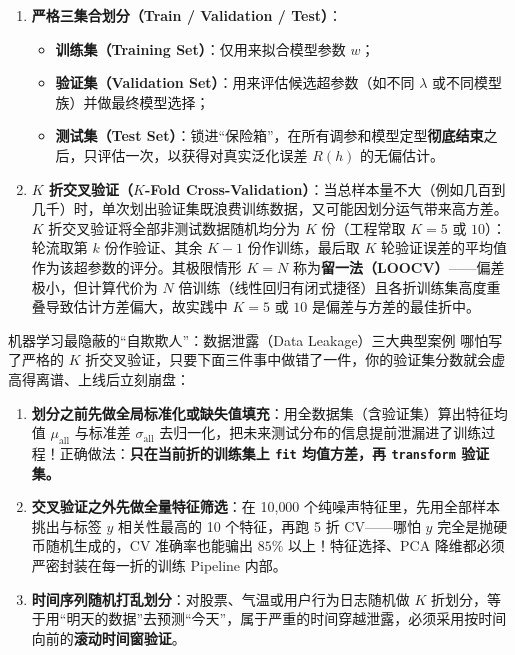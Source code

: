 \begin{enumerate}
  \item \textbf{严格三集合划分（Train / Validation / Test）}：
  \begin{itemize}
    \item \textbf{训练集（Training Set）}：仅用来拟合模型参数 $w$；
    \item \textbf{验证集（Validation Set）}：用来评估候选超参数（如不同 $\lambda$ 或不同模型族）并做最终模型选择；
    \item \textbf{测试集（Test Set）}：锁进“保险箱”，在所有调参和模型定型\textbf{彻底结束}之后，只评估一次，以获得对真实泛化误差 $R(h)$ 的无偏估计。
  \end{itemize}
  \item \textbf{$K$ 折交叉验证（$K$-Fold Cross-Validation）}：当总样本量不大（例如几百到几千）时，单次划出验证集既浪费训练数据，又可能因划分运气带来高方差。$K$ 折交叉验证将全部非测试数据随机均分为 $K$ 份（工程常取 $K = 5$ 或 $10$）：轮流取第 $k$ 份作验证、其余 $K-1$ 份作训练，最后取 $K$ 轮验证误差的平均值作为该超参数的评分。其极限情形 $K = N$ 称为\textbf{留一法（LOOCV）}——偏差极小，但计算代价为 $N$ 倍训练（线性回归有闭式捷径）且各折训练集高度重叠导致估计方差偏大，故实践中 $K = 5$ 或 $10$ 是偏差与方差的最佳折中。
\end{enumerate}

\begin{failBox}{机器学习最隐蔽的“自欺欺人”：数据泄露（Data Leakage）三大典型案例}
哪怕写了严格的 $K$ 折交叉验证，只要下面三件事中做错了一件，你的验证集分数就会虚高得离谱、上线后立刻崩盘：
\begin{enumerate}
  \item \textbf{划分之前先做全局标准化或缺失值填充}：用全数据集（含验证集）算出特征均值 $\mu_{\text{all}}$ 与标准差 $\sigma_{\text{all}}$ 去归一化，把未来测试分布的信息提前泄漏进了训练过程！正确做法：\textbf{只在当前折的训练集上 \texttt{fit} 均值方差，再 \texttt{transform} 验证集。}
  \item \textbf{交叉验证之外先做全量特征筛选}：在 10{,}000 个纯噪声特征里，先用全部样本挑出与标签 $y$ 相关性最高的 10 个特征，再跑 5 折 CV——哪怕 $y$ 完全是抛硬币随机生成的，CV 准确率也能骗出 $85\%$ 以上！特征选择、PCA 降维都必须严密封装在每一折的训练 Pipeline 内部。
  \item \textbf{时间序列随机打乱划分}：对股票、气温或用户行为日志随机做 $K$ 折划分，等于用“明天的数据”去预测“今天”，属于严重的时间穿越泄露，必须采用按时间向前的\textbf{滚动时间窗验证}。
\end{enumerate}
\end{failBox}

